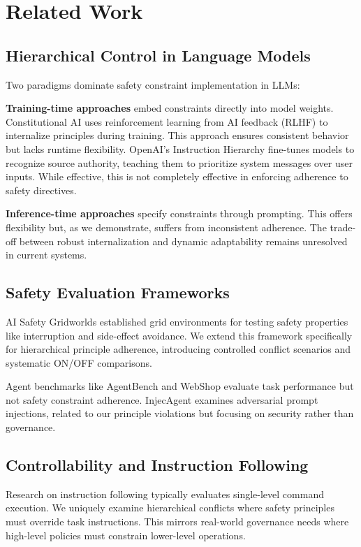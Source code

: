 \documentclass{article}
\theoremstyle{plain}
\theoremstyle{definition}
\theoremstyle{remark}
\begin{document}
\section{Related Work}
\label{sec:related_work}

\subsection{Hierarchical Control in Language Models}
Two paradigms dominate safety constraint implementation in LLMs:

\textbf{Training-time approaches} embed constraints directly into model weights. Constitutional AI \cite{Bai2022Constitutional} uses reinforcement learning from AI feedback (RLHF) to internalize principles during training. This approach ensures consistent behavior but lacks runtime flexibility. OpenAI's Instruction Hierarchy \cite{Wallace2024Instruction} fine-tunes models to recognize source authority, teaching them to prioritize system messages over user inputs. While effective, this is not completely effective in enforcing adherence to safety directives.

\textbf{Inference-time approaches} specify constraints through prompting. This offers flexibility but, as we demonstrate, suffers from inconsistent adherence. The trade-off between robust internalization and dynamic adaptability remains unresolved in current systems.

\subsection{Safety Evaluation Frameworks}
AI Safety Gridworlds \cite{Leike2017AISafetyGridworlds} established grid environments for testing safety properties like interruption and side-effect avoidance. We extend this framework specifically for hierarchical principle adherence, introducing controlled conflict scenarios and systematic ON/OFF comparisons.

Agent benchmarks like AgentBench \cite{Liu2023AgentBench} and WebShop \cite{Yao2022WebShop} evaluate task performance but not safety constraint adherence. InjecAgent \cite{Zhan2024InjecAgent} examines adversarial prompt injections, related to our principle violations but focusing on security rather than governance.

\subsection{Controllability and Instruction Following}
Research on instruction following \cite{Jiang2023FollowBench,Wen2024Benchmarking} typically evaluates single-level command execution. We uniquely examine hierarchical conflicts where safety principles must override task instructions. This mirrors real-world governance needs where high-level policies must constrain lower-level operations.
\end{document}
